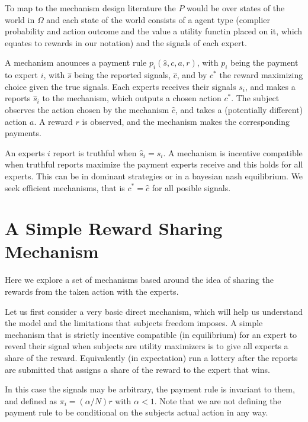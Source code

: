 To map to the mechanism design literature the $P$ would be over states of the world in $\Omega$ and each state of the world consists of a agent type (complier probability and action outcome and the value a utility functin placed on it, which equates to rewards in our notation) and the signals of each expert.

A mechanism anounces a payment rule $p_i(\hat{s}, c,a,r)$, with $p_i$ being the payment to expert $i$, with $\hat{s}$ being the reported signals, $\hat{c}$, and by $c^{*}$ the reward maximizing choice given the true signals.
Each experts receives their signals $s_i$, and makes a reports $\hat{s}_i$ to the mechanism, which outputs a chosen action $c^{*}$.
The subject observes the action chosen by the mechanism $\hat{c}$, and takes a (potentially different) action $a$. A reward $r$ is observed, and the mechanism makes the corresponding payments.

An experts $i$ report is truthful when $\hat{s}_i=s_i$. A mechanism is incentive compatible when truthful reports maximize the payment experts receive and this holds for all experts. This can be in dominant strategies or in a bayesian nash equilibrium.  We seek efficient mechanisms, that is $c^{*} = \hat{c}$ for all posible signals.


\section{A Simple Reward Sharing Mechanism}

Here we explore a set of mechanisms based around the idea of sharing the rewards from the taken action with the experts.

Let us first consider a very basic direct mechanism, which will help us understand the model and the limitations that subjects freedom imposes. 
A simple mechanism that is strictly incentive compatible (in equilibrium) for an expert to reveal their signal when subjects are utility maximizers is to give all experts a share of the reward. Equivalently (in expectation) run a lottery after the reports are submitted that assigns a share of the reward to the expert that wins. 

In this case the signals may be arbitrary, the payment rule is invariant to them, and defined as $\pi_i  = (\alpha / N ) r $ with $\alpha < 1$. Note that we are not defining the payment rule to be conditional on the subjects actual action in any way. %

